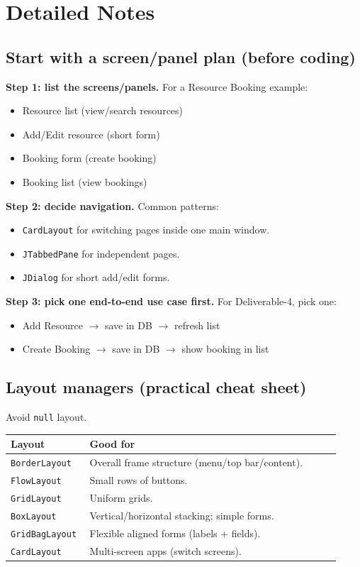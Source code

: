 \documentclass[11pt]{article}
\begin{document}
\section{Detailed Notes}
\subsection{Start with a screen/panel plan (before coding)}
\textbf{Step 1: list the screens/panels.} For a Resource Booking example:
\begin{itemize}
  \item Resource list (view/search resources)
  \item Add/Edit resource (short form)
  \item Booking form (create booking)
  \item Booking list (view bookings)
\end{itemize}

\textbf{Step 2: decide navigation.} Common patterns:
\begin{itemize}
  \item \texttt{CardLayout} for switching pages inside one main window.
  \item \texttt{JTabbedPane} for independent pages.
  \item \texttt{JDialog} for short add/edit forms.
\end{itemize}

\textbf{Step 3: pick one end-to-end use case first.} For Deliverable-4, pick one:
\begin{itemize}
  \item Add Resource $\rightarrow$ save in DB $\rightarrow$ refresh list
  \item Create Booking $\rightarrow$ save in DB $\rightarrow$ show booking in list
\end{itemize}

\subsection{Layout managers (practical cheat sheet)}
Avoid \texttt{null} layout.

\begin{tabular}{@{}p{0.23\linewidth}p{0.73\linewidth}@{}}
\toprule
\textbf{Layout} & \textbf{Good for} \\
\midrule
\texttt{BorderLayout} & Overall frame structure (menu/top bar/content). \\
\texttt{FlowLayout} & Small rows of buttons. \\
\texttt{GridLayout} & Uniform grids. \\
\texttt{BoxLayout} & Vertical/horizontal stacking; simple forms. \\
\texttt{GridBagLayout} & Flexible aligned forms (labels + fields). \\
\texttt{CardLayout} & Multi-screen apps (switch screens). \\
\bottomrule
\end{tabular}
\end{document}
